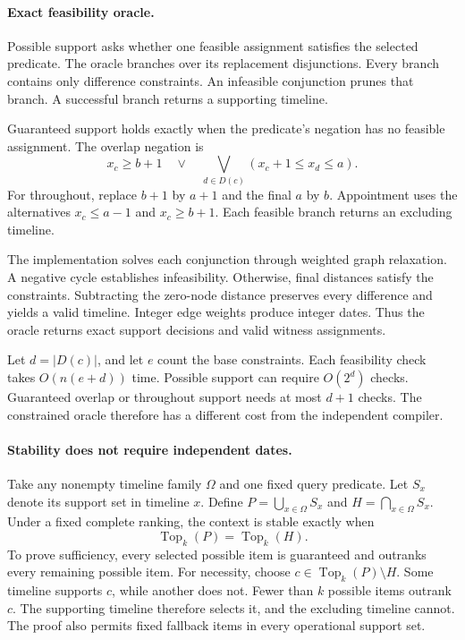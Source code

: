 \paragraph{Exact feasibility oracle.}
Possible support asks whether one feasible assignment satisfies the selected predicate.
The oracle branches over its replacement disjunctions.
Every branch contains only difference constraints.
An infeasible conjunction prunes that branch.
A successful branch returns a supporting timeline.

Guaranteed support holds exactly when the predicate's negation has no feasible assignment.
The overlap negation is
\[
 x_c\ge b+1\quad\lor\quad
 \bigvee_{d\in D(c)}(x_c+1\le x_d\le a).
\]
For throughout, replace $b+1$ by $a+1$ and the final $a$ by $b$.
Appointment uses the alternatives $x_c\le a-1$ and $x_c\ge b+1$.
Each feasible branch returns an excluding timeline.

The implementation solves each conjunction through weighted graph relaxation.
A negative cycle establishes infeasibility.
Otherwise, final distances satisfy the constraints.
Subtracting the zero-node distance preserves every difference and yields a valid timeline.
Integer edge weights produce integer dates.
Thus the oracle returns exact support decisions and valid witness assignments.

Let $d=|D(c)|$, and let $e$ count the base constraints.
Each feasibility check takes $O(n(e+d))$ time.
Possible support can require $O(2^d)$ checks.
Guaranteed overlap or throughout support needs at most $d+1$ checks.
The constrained oracle therefore has a different cost from the independent compiler.

\paragraph{Stability does not require independent dates.}
Take any nonempty timeline family $\Omega$ and one fixed query predicate.
Let $S_x$ denote its support set in timeline $x$.
Define $P=\bigcup_{x\in\Omega}S_x$ and $H=\bigcap_{x\in\Omega}S_x$.
Under a fixed complete ranking, the context is stable exactly when
\[
 \operatorname{Top}_k(P)=\operatorname{Top}_k(H).
\]
To prove sufficiency, every selected possible item is guaranteed and outranks every remaining possible item.
For necessity, choose $c\in\operatorname{Top}_k(P)\setminus H$.
Some timeline supports $c$, while another does not.
Fewer than $k$ possible items outrank $c$.
The supporting timeline therefore selects it, and the excluding timeline cannot.
The proof also permits fixed fallback items in every operational support set.

